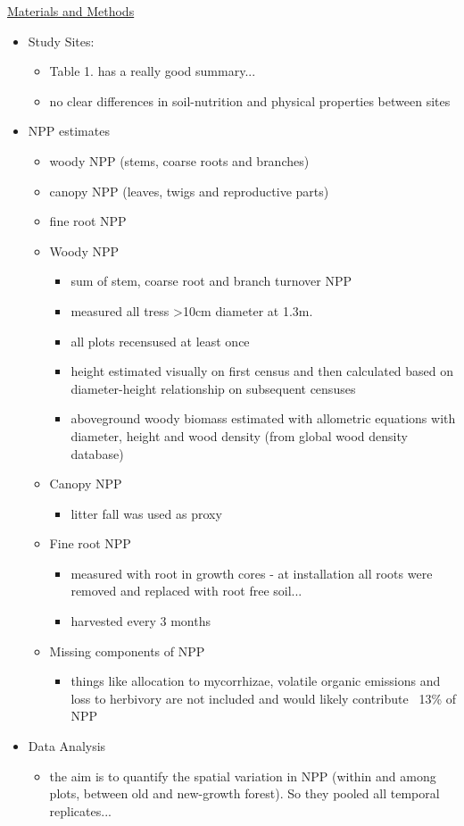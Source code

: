 \underline{Materials and Methods}
\begin{itemize}
	\item Study Sites:
	\begin{itemize}
		\item Table 1. has a really good summary...
		\item no clear differences in soil-nutrition and physical properties between sites
	\end{itemize}
	\item NPP estimates
	\begin{itemize}
		\item woody NPP (stems, coarse roots and branches)
		\item canopy NPP (leaves, twigs and reproductive parts)
		\item fine root NPP	
		\item Woody NPP
		\begin{itemize}
			\item sum of stem, coarse root and branch turnover NPP
			\item measured all tress >10cm diameter at 1.3m.
			\item all plots recensused at least once
			\item height estimated visually on first census and then calculated based on diameter-height relationship on subsequent censuses
			\item aboveground woody biomass estimated with allometric equations with diameter, height and wood density (from global wood density database)
		\end{itemize}
		\item Canopy NPP
		\begin{itemize}
			\item litter fall was used as proxy
		\end{itemize}
		\item Fine root NPP
		\begin{itemize}
			\item measured with root in growth cores - at installation all roots were removed and replaced with root free soil...
			\item harvested every 3 months
		\end{itemize}
		\item Missing components of NPP
		\begin{itemize}
			\item things like allocation to mycorrhizae, volatile organic emissions and loss to herbivory are not included and would likely contribute ~13\% of NPP
		\end{itemize}
	\end{itemize}
	\item Data Analysis
	\begin{itemize}
		\item the aim is to quantify the spatial variation in NPP (within and among plots, between old and new-growth forest). So they pooled all temporal replicates...	
	\end{itemize}
\end{itemize}
